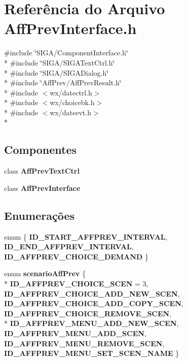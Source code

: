 \section{Referência do Arquivo Aff\+Prev\+Interface.\+h}
\label{_aff_prev_interface_8h}
{\ttfamily \#include \char`\"{}S\+I\+G\+A/\+Component\+Interface.\+h\char`\"{}}\\*
{\ttfamily \#include \char`\"{}S\+I\+G\+A/\+S\+I\+G\+A\+Text\+Ctrl.\+h\char`\"{}}\\*
{\ttfamily \#include \char`\"{}S\+I\+G\+A/\+S\+I\+G\+A\+Dialog.\+h\char`\"{}}\\*
{\ttfamily \#include \char`\"{}Aff\+Prev/\+Aff\+Prev\+Result.\+h\char`\"{}}\\*
{\ttfamily \#include $<$wx/datectrl.\+h$>$}\\*
{\ttfamily \#include $<$wx/choicebk.\+h$>$}\\*
{\ttfamily \#include $<$wx/dateevt.\+h$>$}\\*
\subsection*{Componentes}
\begin{DoxyCompactItemize}
\item 
class {\bf Aff\+Prev\+Text\+Ctrl}
\item 
class {\bf Aff\+Prev\+Interface}
\end{DoxyCompactItemize}
\subsection*{Enumerações}
\begin{DoxyCompactItemize}
\item 
enum \{ {\bf I\+D\+\_\+\+S\+T\+A\+R\+T\+\_\+\+A\+F\+F\+P\+R\+E\+V\+\_\+\+I\+N\+T\+E\+R\+V\+AL}, 
{\bf I\+D\+\_\+\+E\+N\+D\+\_\+\+A\+F\+F\+P\+R\+E\+V\+\_\+\+I\+N\+T\+E\+R\+V\+AL}, 
{\bf I\+D\+\_\+\+A\+F\+F\+P\+R\+E\+V\+\_\+\+C\+H\+O\+I\+C\+E\+\_\+\+D\+E\+M\+A\+ND}
 \}
\item 
enum {\bf scenario\+Aff\+Prev} \{ \\*
{\bf I\+D\+\_\+\+A\+F\+F\+P\+R\+E\+V\+\_\+\+C\+H\+O\+I\+C\+E\+\_\+\+S\+C\+EN} = 3, 
{\bf I\+D\+\_\+\+A\+F\+F\+P\+R\+E\+V\+\_\+\+C\+H\+O\+I\+C\+E\+\_\+\+A\+D\+D\+\_\+\+N\+E\+W\+\_\+\+S\+C\+EN}, 
{\bf I\+D\+\_\+\+A\+F\+F\+P\+R\+E\+V\+\_\+\+C\+H\+O\+I\+C\+E\+\_\+\+A\+D\+D\+\_\+\+C\+O\+P\+Y\+\_\+\+S\+C\+EN}, 
{\bf I\+D\+\_\+\+A\+F\+F\+P\+R\+E\+V\+\_\+\+C\+H\+O\+I\+C\+E\+\_\+\+R\+E\+M\+O\+V\+E\+\_\+\+S\+C\+EN}, 
\\*
{\bf I\+D\+\_\+\+A\+F\+F\+P\+R\+E\+V\+\_\+\+M\+E\+N\+U\+\_\+\+A\+D\+D\+\_\+\+N\+E\+W\+\_\+\+S\+C\+EN}, 
{\bf I\+D\+\_\+\+A\+F\+F\+P\+R\+E\+V\+\_\+\+M\+E\+N\+U\+\_\+\+A\+D\+D\+\_\+\+S\+C\+EN}, 
{\bf I\+D\+\_\+\+A\+F\+F\+P\+R\+E\+V\+\_\+\+M\+E\+N\+U\+\_\+\+R\+E\+M\+O\+V\+E\+\_\+\+S\+C\+EN}, 
{\bf I\+D\+\_\+\+A\+F\+F\+P\+R\+E\+V\+\_\+\+M\+E\+N\+U\+\_\+\+S\+E\+T\+\_\+\+S\+C\+E\+N\+\_\+\+N\+A\+ME}
 \}
\end{DoxyCompactItemize}


